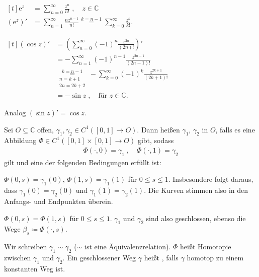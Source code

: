 
\begin{example}
  \begin{enum-arab}
    \item
    \hfill$\begin{aligned}[t]
      \mathrm{e}^z &= \sum\limits_{n=0}^{\infty} \frac{z^n}{n!} \; , \quad z \in \mathbb{C} \\
      (\mathrm{e}^z)' &= \sum\limits_{n=1}^{\infty} \frac{n z^{n-1}}{n!} \overset{k = n-1}{=}
        \sum\limits_{k=0}^{\infty} \frac{z^k}{k!}.
    \end{aligned}$\hfill\null
    
    \item
    \hfill$\begin{aligned}[t]
      (\cos z)'
      &= \left( \sum\limits_{n=0}^{\infty} (-1)^n \frac{z^{2n}}{(2n)!} \right)' \\
      &= - \sum\limits_{n=1}^{\infty} (-1)^{n-1} \frac{z^{2n-1}}{(2n-1)!} \\
      &\overset{k=n-1}{\underset{\substack{n=k+1\\2n = 2k+2}}{=}}
      - \sum\limits_{k=0}^{\infty} (-1)^{k} \frac{z^{2k+1}}{(2k+1)!} \\
      &= - \sin z \; , \quad \text{für } z \in \mathbb{C}.
    \end{aligned}$\hfill\null
    
    \item Analog $(\sin z)' = \cos z$.
  \end{enum-arab}
\end{example}

\begin{theorem}[Definition]
  Sei $O \subseteq \mathbb{C}$ offen, $\gamma_1, \gamma_2 \in C^1([0,1] \to O)$. Dann heißen $\gamma_1$, $\gamma_2$  in $O$, falls es eine Abbildung $\Phi \in C^1([0,1] \times [0,1] \to O)$ gibt, sodass
  \begin{align*}
    \Phi(\cdot,0) = \gamma_1 \; , \quad \Phi(\cdot,1) = \gamma_2
  \end{align*}
  gilt und eine der folgenden Bedingungen erfüllt ist:
  \begin{enum-roman}
    \item $\Phi(0,s) = \gamma_1(0)$, $\Phi(1,s) = \gamma_1(1)$ für $0 \leq s \leq 1$. Insbesondere folgt daraus, dass $\gamma_1(0) = \gamma_2(0)$ und $\gamma_1(1) = \gamma_2(1)$. Die Kurven stimmen also in den Anfangs- und Endpunkten überein.
    
    \item $\Phi(0,s) = \Phi(1,s)$ für $0 \leq s \leq 1$. $\gamma_1$ und $\gamma_2$ sind also geschlossen, ebenso die Wege $\beta_s \coloneq \Phi(\cdot,s)$.
  \end{enum-roman}
  Wir schreiben $\gamma_1 \sim \gamma_2$ ($\sim$ ist eine Äquivalenzrelation). $\Phi$ heißt Homotopie zwischen $\gamma_1$ und $\gamma_2$. Ein geschlossener Weg $\gamma$ heißt , falls $\gamma$ homotop zu einem konstanten Weg ist.
\end{theorem}

